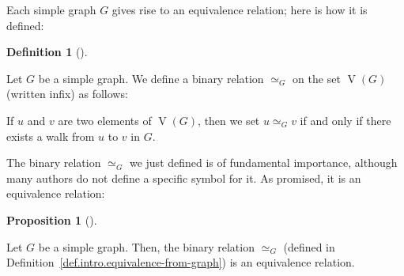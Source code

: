 \documentclass[numbers=enddot,12pt,final,onecolumn,notitlepage]{scrartcl}%
\theoremstyle{definition}
\newtheorem{prop}[theo]{Proposition}
\newenvironment{proposition}[1][]
{\begin{prop}[#1]\begin{leftbar}}
{\end{leftbar}\end{prop}}
\newtheorem{defi}[theo]{Definition}
\newenvironment{definition}[1][]
{\begin{defi}[#1]\begin{leftbar}}
{\end{leftbar}\end{defi}}
\newcommand{\verts}[1]{\operatorname{V}\left( #1 \right)}
\begin{document}
Each simple graph $G$ gives rise to an equivalence relation; here is
how it is defined:

\begin{definition} \label{def.intro.equivalence-from-graph}
Let $G$ be a simple graph. We define a binary relation $\simeq_G$ on
the set $\verts{G}$ (written infix) as follows:

If $u$ and $v$ are two elements of $\verts{G}$, then we set
$u \simeq_G v$ if and only if there exists a walk from $u$ to $v$ in
$G$.
\end{definition}

The binary relation $\simeq_G$ we just defined is of fundamental
importance, although many authors do not define a specific symbol for
it. As promised, it is an equivalence relation:

\begin{proposition} \label{prop.intro.equivalence-from-graph.equiv}
Let $G$ be a simple graph. Then, the binary relation $\simeq_G$
(defined in Definition~\ref{def.intro.equivalence-from-graph}) is an
equivalence relation.
\end{proposition}
\end{document}
